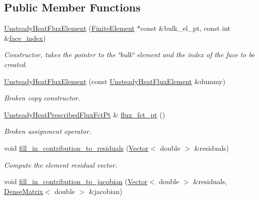 \subsection*{Public Member Functions}
\begin{DoxyCompactItemize}
\item 
\hyperlink{classoomph_1_1UnsteadyHeatFluxElement_aa65a97bfa54e4fb70c853ec8592611ef}{Unsteady\+Heat\+Flux\+Element} (\hyperlink{classoomph_1_1FiniteElement}{Finite\+Element} $\ast$const \&bulk\+\_\+el\+\_\+pt, const int \&\hyperlink{classoomph_1_1FaceElement_a478d577ac6db67ecc80f1f02ae3ab170}{face\+\_\+index})
\begin{DoxyCompactList}\small\item\em Constructor, takes the pointer to the \char`\"{}bulk\char`\"{} element and the index of the face to be created. \end{DoxyCompactList}\item 
\hyperlink{classoomph_1_1UnsteadyHeatFluxElement_abbd32edae63a565d7666981421dd5d90}{Unsteady\+Heat\+Flux\+Element} (const \hyperlink{classoomph_1_1UnsteadyHeatFluxElement}{Unsteady\+Heat\+Flux\+Element} \&dummy)
\begin{DoxyCompactList}\small\item\em Broken copy constructor. \end{DoxyCompactList}\item 
\hyperlink{classoomph_1_1UnsteadyHeatFluxElement_ab60a211e1cee492be6c9b93d6aa36883}{Unsteady\+Heat\+Prescribed\+Flux\+Fct\+Pt} \& \hyperlink{classoomph_1_1UnsteadyHeatFluxElement_a8e1f2f3ef05006ff79bbe6e4795c80e9}{flux\+\_\+fct\+\_\+pt} ()
\begin{DoxyCompactList}\small\item\em Broken assignment operator. \end{DoxyCompactList}\item 
void \hyperlink{classoomph_1_1UnsteadyHeatFluxElement_a6036eb80ba835cb022d0e31688732100}{fill\+\_\+in\+\_\+contribution\+\_\+to\+\_\+residuals} (\hyperlink{classoomph_1_1Vector}{Vector}$<$ double $>$ \&residuals)
\begin{DoxyCompactList}\small\item\em Compute the element residual vector. \end{DoxyCompactList}\item 
void \hyperlink{classoomph_1_1UnsteadyHeatFluxElement_af14223df9a18aea9f30d96d918a80aeb}{fill\+\_\+in\+\_\+contribution\+\_\+to\+\_\+jacobian} (\hyperlink{classoomph_1_1Vector}{Vector}$<$ double $>$ \&residuals, \hyperlink{classoomph_1_1DenseMatrix}{Dense\+Matrix}$<$ double $>$ \&jacobian)

\end{DoxyCompactItemize}
